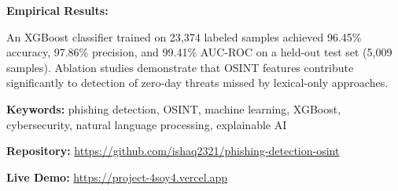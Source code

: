 \textbf{Empirical Results:}

An XGBoost classifier trained on 23,374 labeled samples achieved 96.45\% accuracy, 97.86\% precision, and 99.41\% AUC-ROC on a held-out test set (5,009 samples). Ablation studies demonstrate that OSINT features contribute significantly to detection of zero-day threats missed by lexical-only approaches.

\textbf{Keywords:} phishing detection, OSINT, machine learning, XGBoost, cybersecurity, natural language processing, explainable AI

\textbf{Repository:} \url{https://github.com/ishaq2321/phishing-detection-osint}

\textbf{Live Demo:} \url{https://project-4soy4.vercel.app}
